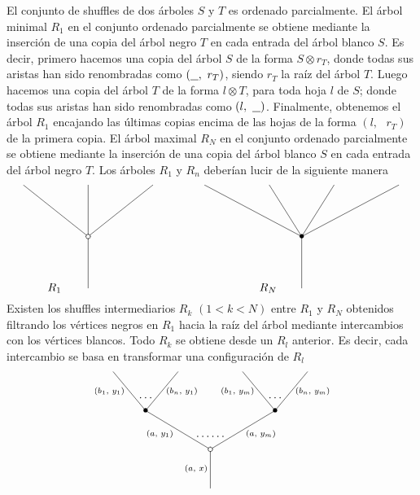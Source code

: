 \documentclass[11pt,a4paper,openright,oneside]{article}
\numberwithin{equation}{section}
\theoremstyle{definition}
\begin{document}
El conjunto de shuffles de dos \'arboles $S$ y $T$ es ordenado parcialmente. El \'arbol minimal $R_1$ en el conjunto ordenado parcialmente se obtiene mediante la inserci\'on de una copia del \'arbol negro $T$ en cada entrada del \'arbol blanco $S$.
Es decir, primero hacemos una copia del \'arbol $S$ de la forma $S\otimes r_T$, donde todas sus aristas han sido renombradas como $(\underline{\hspace{.25cm}},\text{ }r_T)$, siendo $r_T$ la ra\'iz del \'arbol $T$.
Luego hacemos una copia del \'arbol $T$ de la forma $l\otimes T$, para toda hoja $l$ de $S$; donde todas sus aristas han sido renombradas como $(l,\text{ }\underline{\hspace{.25cm}})$.
Finalmente, obtenemos el \'arbol $R_1$ encajando las \'ultimas copias encima de las hojas de la forma $(l,\text{ }r_T)$ de la primera copia.
El \'arbol maximal $R_N$ en el conjunto ordenado parcialmente se obtiene mediante la inserci\'on de una copia del \'arbol blanco $S$ en cada entrada del \'arbol negro $T$.
Los \'arboles $R_1$ y $R_n$ deber\'ian lucir de la siguiente manera
$$
    \xy
    <0.08cm, 0cm>:
    (0.0, 0.0)*{}="1"; %
    (0.0, 20.0)*\cir<2pt>{}="2"; %
    (-25.0, 40.0)*{}="3"; %
    (0.0, 40.0)*{}="4"; %
    (25.0, 40.0)*{}="5"; %
    "1";"2" **\dir{-};
    "2";"3" **\dir{-};
    "2";"4" **\dir{-};
    "2";"5" **\dir{-};
    (-13,0)*{R_1};
    \endxy
    \xy
    <0.08cm, 0cm>:
    (-10, 0.0)*{}="1";
    (10, 10.0)*{}="2";
    \endxy
    \xy
    <0.08cm, 0cm>:
    (0.0, 0.0)*{}="1"; %
    (0.0, 20.0)*=0{\bullet}="2"; %
    (-37.5, 40.0)*{}="3"; %
    (-12.5, 40.0)*{}="4"; %
    (12.5, 40.0)*{}="5"; %
    (37.5, 40.0)*{}="6"; %
    "1";"2" **\dir{-};
    "2";"3" **\dir{-};
    "2";"4" **\dir{-};
    "2";"5" **\dir{-};
    "2";"6" **\dir{-};
    (-13,0)*{R_N};
    \endxy
$$
Existen los shuffles intermediarios $R_k$ $(1 < k < N)$ entre $R_1$ y $R_N$ obtenidos filtrando los v\'ertices negros en $R_1$ hacia la ra\'iz del \'arbol mediante intercambios con los v\'ertices blancos.
Todo $R_k$ se obtiene desde un $R_l$ anterior. Es decir, cada intercambio se basa en transformar una configuraci\'on de $R_l$
\begin{equation}
    \xy
    <0.08cm, 0cm>:
    (0.0, 0.0)*{}="1"; %
    (0.0, 15.0)*\cir<2pt>{}="2"; %
    (-25.0, 30.0)*=0{\bullet}="3"; %
    (-37.5, 45.0)*{}="4"; %
    (-12.5, 45.0)*{}="5"; %
    (25.0, 30.0)*=0{\bullet}="6"; %
    (12.5, 45.0)*{}="7"; %
    (37.5, 45.0)*{}="8"; %
    "1";"2" **\dir{-};
    "2";"3" **\dir{-};
    "3";"4" **\dir{-};
    "3";"5" **\dir{-};
    "2";"6" **\dir{-};
    "6";"7" **\dir{-};
    "6";"8" **\dir{-};
    (-5.5, 7.5)*=0{\scriptstyle (a,\text{ }x)};
    (-19.5, 21)*=0{\scriptstyle (a,\text{ }y_1)};
    (-39, 37.5)*=0{\scriptstyle (b_1,\text{ }y_1)};
    (-11, 37.5)*=0{\scriptstyle (b_n,\text{ }y_1)};
    (19.5, 21)*=0{\scriptstyle (a,\text{ }y_m)};
    (10.5, 37.5)*=0{\scriptstyle (b_1,\text{ }y_m)};
    (39.5, 37.5)*=0{\scriptstyle (b_n,\text{ }y_m)};
    (-25,35)*{\dots};
    (25,35)*{\dots};
    (0,20)*{\dots\dots};
    \endxy
\end{equation}
\end{document}
